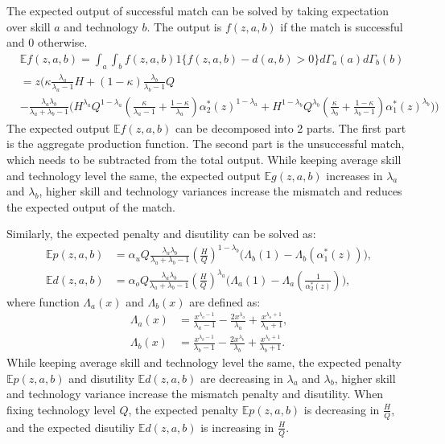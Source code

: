 \documentclass[12pt]{article}
\newcommand{\E}{\mathbb{E}}
\newcommand{\1}{\mathbb{1}}
\begin{document}
The expected output of successful match can be solved by taking expectation over skill $a$ and technology $b$. The output is $f(z,a,b)$ if the match is successful and $0$ otherwise. 
\begin{align*}
& \E f(z,a,b)= \int_a\int_bf(z,a,b)1\{f(z,a,b)-d(a,b)>0\}d\Gamma_a(a)d\Gamma_b(b) \\
&= z\Big(\kappa\frac{\lambda_a}{\lambda_a-1}H+(1-\kappa)\frac{\lambda_b}{\lambda_b-1}Q \\
&-\frac{\lambda_a\lambda_b}{\lambda_a+\lambda_b-1}\big(H^{\lambda_a}Q^{1-\lambda_a}(\frac{\kappa}{\lambda_a-1}+\frac{1-\kappa}{\lambda_a})\alpha_2^*(z)^{1-\lambda_a}+H^{1-\lambda_b}Q^{\lambda_b}(\frac{\kappa}{\lambda_b}+\frac{1-\kappa}{\lambda_b-1})\alpha_1^*(z)^{\lambda_b}\big)\Big)
\end{align*}
The expected output $\E f(z,a,b)$ can be decomposed into 2 parts. The first part is the aggregate production function. The second part is the unsuccessful match, which needs to be subtracted from the total output. While keeping average skill and technology level the same, the expected output $\E g(z,a,b)$ increases in $\lambda_a$ and $\lambda_b$, higher skill and technology variances increase the mismatch and reduces the expected output of the match. 

Similarly, the expected penalty and disutility can be solved as: 
\begin{align*}
\E p(z,a,b) &= \alpha_uQ \frac{\lambda_a\lambda_b}{\lambda_a+\lambda_b-1}(\frac{H}{Q})^{1-\lambda_b}\Big(\Lambda_b(1)-\Lambda_b(\alpha_1^*(z))\Big), \\
\E d(z,a,b) &= \alpha_oQ \frac{\lambda_a\lambda_b}{\lambda_a+\lambda_b-1}(\frac{H}{Q})^{\lambda_a}\Big(\Lambda_a(1)-\Lambda_a(\frac{1}{\alpha_2^*(z)})\Big),
\end{align*}
where function $\Lambda_a(x)$ and $\Lambda_b(x)$ are defined as: 
\begin{align*}
\Lambda_a(x) &= \frac{x^{\lambda_a-1}}{\lambda_a-1}- \frac{2x^{\lambda_a}}{\lambda_a}+ \frac{x^{\lambda_a+1}}{\lambda_a+1},\\
\Lambda_b(x) &= \frac{x^{\lambda_b-1}}{\lambda_b-1}- \frac{2x^{\lambda_b}}{\lambda_b}+ \frac{x^{\lambda_b+1}}{\lambda_b+1}.
\end{align*}
While keeping average skill and technology level the same, the expected penalty $\E p(z,a,b)$ and disutility $\E d(z,a,b)$ are decreasing in $\lambda_a$ and $\lambda_b$, higher skill and technology variance increase the mismatch penalty and disutility. When fixing technology level $Q$, the expected penalty $\E p(z,a,b)$ is decreasing in $\frac{H}{Q}$, and the expected disutiliy $\E d(z,a,b)$ is increasing in $\frac{H}{Q}$. 
\end{document}
